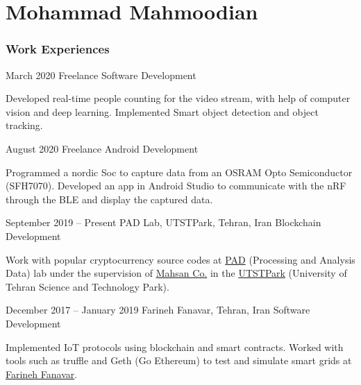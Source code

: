 \documentclass{tccv}
\begin{document}
\part{Mohammad Mahmoodian}

\section{Work Experiences}

\begin{eventlist}

\item{March 2020}
	{Freelance}
	{Software Development}

	Developed real-time people counting for the video stream, with help of computer vision and deep learning. Implemented Smart object detection and object tracking.

\item{August 2020}
	{Freelance}
	{Android Development}

	Programmed a nordic Soc to capture data from an OSRAM Opto Semiconductor (SFH7070). Developed an app in Android Studio to communicate with the nRF through the BLE and display the captured data.

%


\item{September 2019 -- Present}
     {PAD Lab, UTSTPark, Tehran, Iran}
     {Blockchain Development}
     
	Work with popular cryptocurrency source codes at \href{www.padlab.ir}{PAD} (Processing and Analysis Data) lab under the supervision of \href{www.mahsan.co}{Mahsan Co.} in the \href{www.utstpark.ir}{UTSTPark} (University of Tehran Science and Technology Park).

%

%

\item{December 2017 -- January 2019}
     {Farineh Fanavar, Tehran, Iran}
     {Software Development}

	Implemented IoT protocols using blockchain and smart contracts. Worked with tools such as truffle and Geth (Go Ethereum) to test and simulate smart grids at \href{http://farinehtech.com/}{Farineh Fanavar}.

\end{eventlist}
\end{document}
